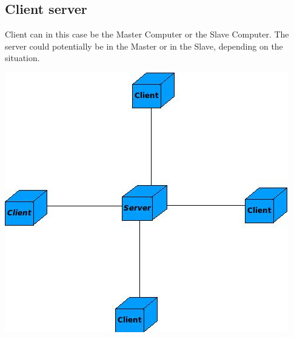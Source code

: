 \documentclass[a4paper,12pt,final]{article}
\begin{document}
\subsection{Client server}
Client can in this case be the Master Computer or the Slave Computer. The server could potentially be in the Master or in the Slave, depending on the situation.
\begin{center}
  	\includegraphics[scale=0.6]{ClientServer.jpeg} 
\end{center}

\newpage
\end{document}
